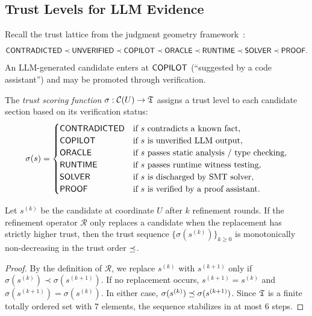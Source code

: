 \documentclass[11pt]{article}
\newcommand{\CandSpace}{\mathcal{C}}
\newcommand{\RefineOp}{\mathcal{R}}
\newcommand{\ProofScore}{\sigma}
\begin{document}
\subsection{Trust Levels for LLM Evidence}\label{subsec:trust-levels}

Recall the trust lattice from the judgment geometry
framework~\cite{JuGeo2024-trust}:
\[
  \mathsf{CONTRADICTED} \prec \mathsf{UNVERIFIED} \prec \mathsf{COPILOT} \prec \mathsf{ORACLE} \prec
  \mathsf{RUNTIME} \prec \mathsf{SOLVER} \prec \mathsf{PROOF}.
\]
An LLM-generated candidate enters at $\mathsf{COPILOT}$ (``suggested by a
code assistant'') and may be promoted through verification.

\begin{definition}\label{def:trust-score}
The \emph{trust scoring function}
$\ProofScore : \CandSpace(U) \to \Talg$ assigns a trust level to
each candidate section based on its verification status:
\[
  \ProofScore(s) =
  \begin{cases}
    \Tcontra & \text{if } s \text{ contradicts a known fact}, \\
    \Tcopilot & \text{if } s \text{ is unverified LLM output}, \\
    \Toracle & \text{if } s \text{ passes static analysis / type checking}, \\
    \Truntime & \text{if } s \text{ passes runtime witness testing}, \\
    \Tsolver & \text{if } s \text{ is discharged by SMT solver}, \\
    \Tproof & \text{if } s \text{ is verified by a proof assistant}.
  \end{cases}
\]
\end{definition}

\begin{theorem}\label{thm:trust-mono}
Let $s^{(k)}$ be the candidate at coordinate $U$ after $k$ refinement
rounds.  If the refinement operator $\RefineOp$ only replaces a
candidate when the replacement has strictly higher trust, then the
trust sequence $\{\ProofScore(s^{(k)})\}_{k \geq 0}$ is monotonically
non-decreasing in the trust order $\preceq$.
\end{theorem}

\begin{proof}
By the definition of $\RefineOp$, we replace $s^{(k)}$ with
$s^{(k+1)}$ only if
$\ProofScore(s^{(k)}) \prec \ProofScore(s^{(k+1)})$.  If no
replacement occurs, $s^{(k+1)} = s^{(k)}$ and
$\ProofScore(s^{(k+1)}) = \ProofScore(s^{(k)})$.  In either case,
$\ProofScore(s^{(k)}) \tleq \ProofScore(s^{(k+1)})$.  Since $\mathfrak{T}$
is a finite totally ordered set with 7 elements, the sequence
stabilizes in at most 6 steps.
\end{proof}
\end{document}
